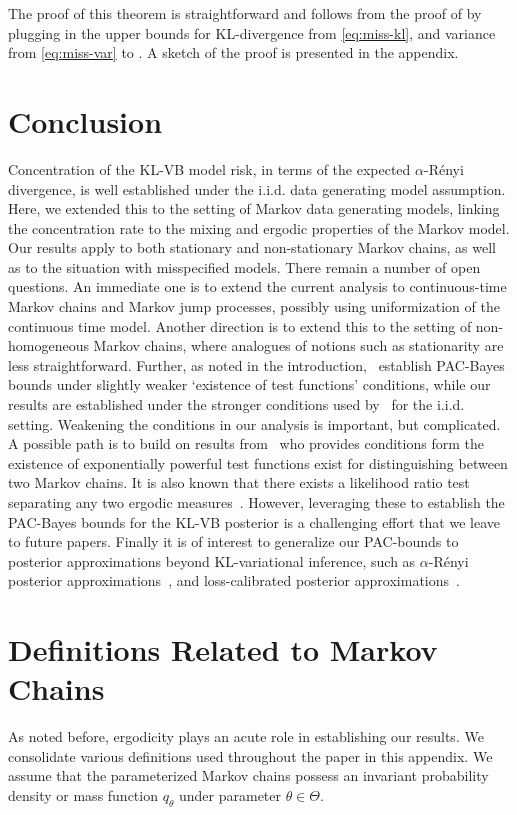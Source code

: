 \documentclass[11pt]{amsart}
\newcommand{\alpren}{$\alpha$-R\'enyi }
\begin{document}
The proof of this theorem is straightforward and follows from the proof of  by plugging in the upper bounds for KL-divergence from \cref{eq:miss-kl}, and variance from \cref{eq:miss-var}  to . A sketch of the proof is presented in the appendix.




\section{Conclusion}

Concentration of the KL-VB model risk, in terms of the expected \alpren divergence, is well established under the i.i.d. data generating model assumption.
Here, we extended this to the setting of Markov data generating models, linking the concentration rate to the mixing and ergodic properties of the Markov model. 
Our results apply to both stationary and non-stationary Markov chains, as well as to the situation with misspecified models.
There remain a number of open questions. An immediate one is to extend the current analysis to continuous-time Markov chains and Markov jump processes, possibly using uniformization of the continuous time model. Another direction is to extend this to the setting of non-homogeneous Markov chains, where analogues of notions such as stationarity are less straightforward. Further, as noted in the introduction,~\cite{pati} establish PAC-Bayes bounds under slightly weaker `existence of test functions' conditions, while our results are established under the stronger conditions used by~\cite{pierre} for the i.i.d. setting. Weakening the conditions in our analysis is important, but complicated. 
A possible path is to build on results from~\cite{birge} who provides conditions form the existence of exponentially powerful test functions exist for distinguishing between two Markov chains. It is also known that there exists a likelihood ratio test separating any two ergodic measures~\cite{ryabko}. However, leveraging these to establish the PAC-Bayes bounds for the KL-VB posterior is a challenging effort that we leave to future papers. 
Finally it is of interest to generalize our PAC-bounds to posterior approximations beyond KL-variational inference, such as $\alpha$-R\'enyi posterior approximations~\cite{li2016renyi}, and loss-calibrated posterior approximations~\cite{LaSiGh2011, jaiswalstat2020}.


\appendix
\section{Definitions Related to Markov Chains}
As noted before, ergodicity plays an acute role in establishing our results. We consolidate various definitions used throughout the paper in this appendix. We assume that the parameterized Markov chains possess an invariant probability density or mass function $q_\theta$ under parameter $\theta \in \Theta$. %
\end{document}
